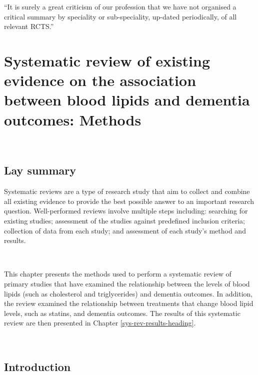 \documentclass[a4paper, twoside]{templates/ociamthesis}
\begin{document}
\begin{savequote}
``It is surely a great criticism of our profession that we have not
organised a critical summary by speciality or sub-speciality, up-dated
periodically, of all relevant RCTS.''
\end{savequote}



\hypertarget{sys-rev-methods-heading}{%
\chapter{Systematic review of existing evidence on the association between blood lipids and dementia outcomes: Methods}\label{sys-rev-methods-heading}}

~

\minitoc 

\begin{laybox}

\hypertarget{lay-summary-2}{%
\section*{Lay summary}\label{lay-summary-2}}

Systematic reviews are a type of research study that aim to collect and combine all existing evidence to provide the best possible answer to an important research question. Well-performed reviews involve multiple steps including: searching for existing studies; assessment of the studies against predefined inclusion criteria; collection of data from each study; and assessment of each study's method and results.

~

This chapter presents the methods used to perform a systematic review of primary studies that have examined the relationship between the levels of blood lipids (such as cholesterol and triglycerides) and dementia outcomes. In addition, the review examined the relationship between treatments that change blood lipid levels, such as statins, and dementia outcomes. The results of this systematic review are then presented in Chapter \ref{sys-rev-results-heading}.

\end{laybox}

~

\hypertarget{sys-rev-intro}{%
\section{Introduction}\label{sys-rev-intro}}
\end{document}
